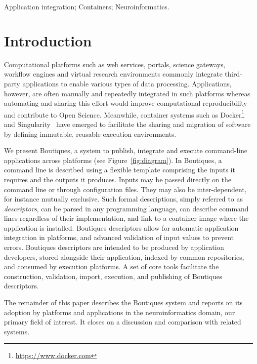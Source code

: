 \documentclass[a4paper,num-refs]{oup-contemporary}
\newcommand{\boutiques}{Boutiques\xspace}
\begin{document}
\begin{keywords}
Application integration; Containers; Neuroinformatics.
\end{keywords}

\section{Introduction}

Computational platforms such as web services, portals, science
gateways, workflow engines and virtual research environments commonly
integrate third-party applications to enable various types of data
processing. Applications, however, are often manually and
repeatedly integrated in such platforms whereas automating and
sharing this effort would improve computational
reproducibility~\cite{peng2011reproducible,Stodden1240} and contribute
to Open Science. Meanwhile, container systems such as
Docker\footnote{\url{https://www.docker.com}} and
Singularity~\cite{kurtzer2017singularity} have emerged to facilitate
the sharing and migration of software by defining immutable, reusable
execution environments.

We present \boutiques, a system to publish, integrate and execute
command-line applications across platforms (see
Figure~\ref{fig:diagram}).  In \boutiques, a command line is described
using a flexible template comprising the inputs it requires and the
outputs it produces. Inputs may be passed directly on the command line
or through configuration files. They may also be inter-dependent, for
instance mutually exclusive. Such formal descriptions, simply referred
to as \emph{descriptors}, can be parsed in any programming language,
can describe command lines regardless of their implementation,
and link to a container image where the application is
installed. \boutiques descriptors allow for automatic application
integration in platforms, and advanced validation of input values to
prevent errors.  \boutiques descriptors are intended to be produced by
application developers, stored alongside their application, indexed by
common repositories, and consumed by execution platforms.  A set of
core tools facilitate the construction, validation, import, execution,
and publishing of \boutiques descriptors.

The remainder of this paper describes the \boutiques system
and reports on its adoption by platforms
and applications in the neuroinformatics domain, our primary field of
interest. It closes on a discussion and
comparison with related systems.
\end{document}

